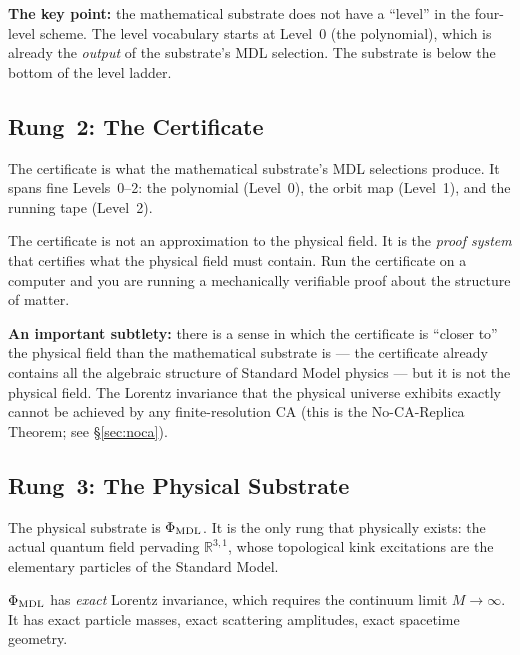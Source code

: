 \documentclass[11pt,a4paper]{article}
\newcommand{\PhiMDL}{\Phi_{\rm MDL}}
\begin{document}
\medskip
\textbf{The key point:} the mathematical substrate does not have a ``level''
in the four-level scheme.
The level vocabulary starts at Level~0 (the polynomial), which is already
the \emph{output} of the substrate's MDL selection.
The substrate is below the bottom of the level ladder.

\subsection{Rung~2: The Certificate}

The certificate is what the mathematical substrate's MDL selections produce.
It spans fine Levels~0--2: the polynomial (Level~0), the orbit map (Level~1),
and the running tape (Level~2).

\medskip
The certificate is not an approximation to the physical field.
It is the \emph{proof system} that certifies what the physical field must
contain.
Run the certificate on a computer and you are running a mechanically
verifiable proof about the structure of matter.

\medskip
\textbf{An important subtlety:} there is a sense in which the certificate is
``closer to'' the physical field than the mathematical substrate is --- the
certificate already contains all the algebraic structure of Standard Model
physics --- but it is not the physical field.
The Lorentz invariance that the physical universe exhibits exactly cannot be
achieved by any finite-resolution CA (this is the No-CA-Replica Theorem;
see \S\ref{sec:noca}).

\subsection{Rung~3: The Physical Substrate}

The physical substrate is $\PhiMDL$.
It is the only rung that physically exists: the actual quantum field pervading
$\mathbb{R}^{3,1}$, whose topological kink excitations are the elementary
particles of the Standard Model.

\medskip
$\PhiMDL$ has \emph{exact} Lorentz invariance, which requires the
continuum limit $M \to \infty$.
It has exact particle masses, exact scattering amplitudes, exact spacetime
geometry.
\end{document}
